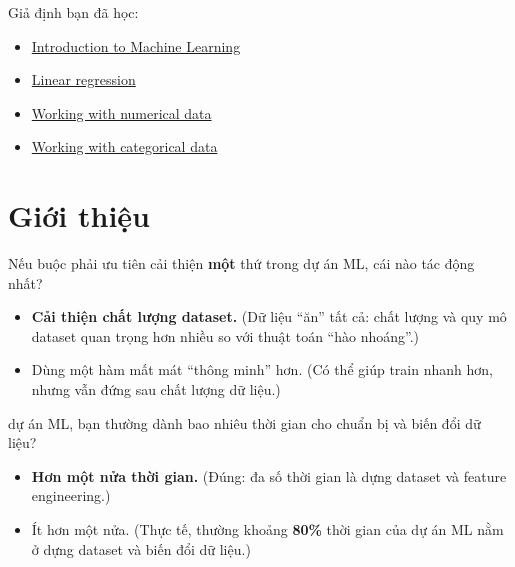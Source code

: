 \documentclass[12pt,a4paper]{article}
\begin{document}
\begin{luuy}[title={Điều kiện tiên quyết}]
Giả định bạn đã học:
\begin{itemize}
  \item \href{https://developers.google.com/machine-learning/intro-to-ml}{Introduction to Machine Learning}
  \item \href{https://developers.google.com/machine-learning/crash-course/linear-regression}{Linear regression}
  \item \href{https://developers.google.com/machine-learning/crash-course/numerical-data}{Working with numerical data}
  \item \href{https://developers.google.com/machine-learning/crash-course/categorical-data}{Working with categorical data}
\end{itemize}
\end{luuy}

\newpage

\section{Giới thiệu}

\begin{dongco}[title={Câu hỏi dẫn dắt: cải thiện thứ gì có tác động nhất?}]
Nếu buộc phải ưu tiên cải thiện \textbf{một} thứ trong dự án ML, cái nào tác động nhất?
\begin{itemize}
  \item \textbf{Cải thiện chất lượng dataset.} (Dữ liệu ``ăn'' tất cả: chất lượng và quy mô dataset quan trọng hơn nhiều so với thuật toán ``hào nhoáng''.)
  \item Dùng một hàm mất mát ``thông minh'' hơn. (Có thể giúp train nhanh hơn, nhưng vẫn đứng sau chất lượng dữ liệu.)
\end{itemize}
\end{dongco}

\begin{luuy}[title={Câu hỏi dẫn dắt thứ hai: thời gian làm dữ liệu}]\nTrong dự án ML, bạn thường dành bao nhiêu thời gian cho chuẩn bị và biến đổi dữ liệu?\n\begin{itemize}\n  \item \textbf{Hơn một nửa thời gian.} (Đúng: đa số thời gian là dựng dataset và feature engineering.)\n  \item Ít hơn một nửa. (Thực tế, thường khoảng \textbf{80\%} thời gian của dự án ML nằm ở dựng dataset và biến đổi dữ liệu.)\n\end{itemize}\n\end{luuy}
\end{document}
